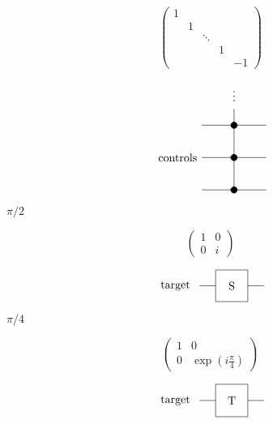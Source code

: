 \documentclass{article}
\begin{document}
\[
\begin{pmatrix}
1 \\
& 1 \\\
& & \ddots \\
& & & 1 \\
& & & & -1 
\end{pmatrix}
\]
\pagebreak

\[
             \begin{tikzpicture}[scale=.5]
             \node[draw=none] at (-3.5, 2) {controls};
             
             \node[draw=none] at (0, 6) {$\vdots$};
             \draw (0, 5) -- (0, 4);
             
             \draw (-2, 4) -- (2, 4);
             \draw[fill=black] (0, 4) circle (.2);
             \draw (0, 4) -- (0, 2); 
             
             \draw (-2, 2) -- (2, 2);
             \draw[fill=black] (0, 2) circle (.2);
             \draw (0, 2) -- (0, 0);
             
             \draw (-2,0) -- (2, 0);
             \draw[fill=black] (0, 0) circle (.2);
             \end{tikzpicture}
\]
\pagebreak

$\pi/2$
\pagebreak

\[
\begin{pmatrix}
1 & 0 \\
0 & i
\end{pmatrix}
\]
\pagebreak

\[
             \begin{tikzpicture}[scale=.5]
             \node[draw=none] at (-3.5, 0) {target};

             \draw (-2,0) -- (-1, 0);
             \draw (1, 0) -- (2, 0);
             \draw (-1,-1)--(-1,1)--(1,1)--(1,-1)--cycle;
             \node[draw=none] at (0, 0) {S};
             \end{tikzpicture}
 \]
\pagebreak

$\pi/4$
\pagebreak

\[
\begin{pmatrix}
1 & 0 \\
0 & \exp\left(i \frac{\pi}{4}\right)
\end{pmatrix}
\]
\pagebreak

\[
             \begin{tikzpicture}[scale=.5]
             \node[draw=none] at (-3.5, 0) {target};

             \draw (-2,0) -- (-1, 0);
             \draw (1, 0) -- (2, 0);
             \draw (-1,-1)--(-1,1)--(1,1)--(1,-1)--cycle;
             \node[draw=none] at (0, 0) {T};
             \end{tikzpicture}
 \]
\pagebreak
\end{document}
